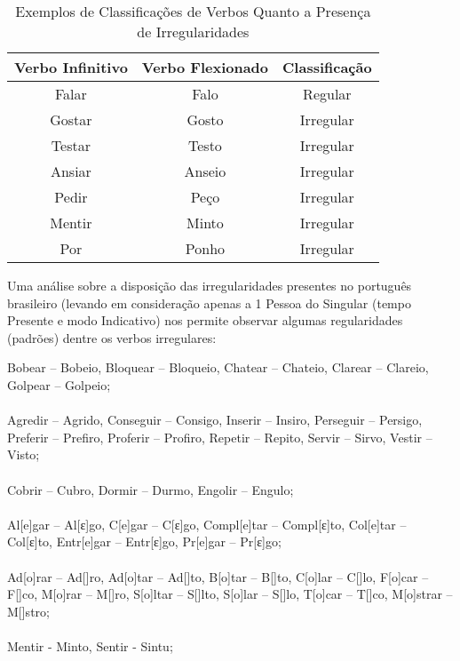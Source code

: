 \begin{center}
\begin{table}[H]
\centering
\begin{tabular}{ccc}
\multicolumn{1}{l}{\textbf{Verbo Infinitivo}} & \multicolumn{1}{l}{\textbf{Verbo Flexionado}} & \multicolumn{1}{l}{\textbf{Classificação}} \\ \hline
Falar & Falo & Regular \\
Gostar & Gosto & Irregular \\
Testar & Testo & Irregular \\
Ansiar & Anseio & Irregular \\
Pedir & Peço & Irregular \\
Mentir & Minto & Irregular \\
Por & Ponho & Irregular
\end{tabular}
\caption{Exemplos de Classificações de Verbos Quanto a Presença de Irregularidades}
\label{tab:irreg}
\end{table}
\end{center}

Uma análise sobre a disposição das irregularidades presentes no português brasileiro (levando em consideração apenas a 1 Pessoa do Singular (tempo Presente e modo Indicativo) nos permite observar algumas regularidades (padrões) dentre os verbos irregulares:\\

\begin{center}

Bobear – Bobeio, Bloquear – Bloqueio, Chatear – Chateio, Clarear – Clareio, Golpear – Golpeio;\\
\\
Agredir – Agrido, Conseguir – Consigo, Inserir – Insiro, Perseguir – Persigo, Preferir – Prefiro, Proferir – Profiro, Repetir – Repito, Servir –  Sirvo, Vestir – Visto;\\
\\
Cobrir – Cubro, Dormir – Durmo, Engolir – Engulo;\\
\\
 Al[e]gar – Al[ε]go, C[e]gar – C[ε]go, Compl[e]tar – Compl[ε]to,  Col[e]tar – Col[ε]to, Entr[e]gar – Entr[ε]go, Pr[e]gar – Pr[ε]go;\\
\\
Ad[o]rar – Ad[\textopeno]ro, Ad[o]tar – Ad[\textopeno]to, B[o]tar – B[\textopeno]to, C[o]lar – C[\textopeno]lo, F[o]car – F[\textopeno]co, M[o]rar – M[\textopeno]ro, S[o]ltar – S[\textopeno]lto, S[o]lar – S[\textopeno]lo, T[o]car – T[\textopeno]co, M[o]strar – M[\textopeno]stro;\\
\\
Mentir - Minto, Sentir - Sintu;

\end{center}




